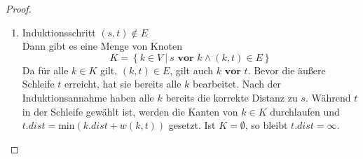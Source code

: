 \documentclass[a4paper]{scrartcl}
\begin{document}
\begin{proof}
\begin{itemize}
\begin{enumerate}
                \item Induktionsschritt $(s, t) \notin E$ \\
                    Dann gibt es eine Menge von Knoten
                    \begin{equation}
                        K = \left\{ k \in V \ |\  s \textbf{ vor } k \land (k, t) \in E \right\}
                    \end{equation}
                    Da für alle $k \in K$ gilt, $(k, t) \in E$, gilt auch $k \textbf{ vor } t$.
                    Bevor die äußere Schleife $t$ erreicht, hat sie bereits alle
                    $k$ bearbeitet.
                    Nach der Induktionsannahme haben alle $k$ bereits die
                    korrekte Distanz zu $s$.
                    Während $t$ in der Schleife gewählt ist, werden die Kanten
                    von $k \in K$ durchlaufen und
                    $t.dist = \textrm{min}(k.dist + w(k, t))$ gesetzt.
                    Ist $K = \emptyset$, so bleibt $t.dist = \infty$.
                    
            \end{enumerate}

    \end{itemize}
\end{proof}
\end{document}
